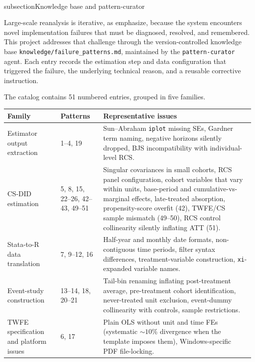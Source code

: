 \\subsection{Knowledge base and pattern-curator}
\label{sec:appc_knowledge}

Large-scale reanalysis is iterative, as \textcite{xu2026scaling} emphasize, because the system encounters novel implementation failures that must be diagnosed, resolved, and remembered. This project addresses that challenge through the version-controlled knowledge base \texttt{knowledge/failure\_patterns.md}, maintained by the \texttt{pattern-curator} agent. Each entry records the estimation step and data configuration that triggered the failure, the underlying technical reason, and a reusable corrective instruction.

The catalog contains 51 numbered entries, grouped in five families.

\begin{table}[H]
\centering
\footnotesize
\begin{tabularx}{\textwidth}{@{}l l X@{}}
\toprule
\textbf{Family} & \textbf{Patterns} & \textbf{Representative issues} \\
\midrule
Estimator output extraction            & 1--4, 19           & Sun--Abraham \texttt{iplot} missing SEs, Gardner term naming, negative horizons silently dropped, BJS incompatibility with individual-level RCS. \\
CS-DID estimation                      & 5, 8, 15, 22--26, 42--43, 49--51 & Singular covariances in small cohorts, RCS panel configuration, cohort variables that vary within units, base-period and cumulative-vs-marginal effects, late-treated absorption, propensity-score overfit (42), TWFE/CS sample mismatch (49--50), RCS control collinearity silently inflating ATT (51). \\
Stata-to-R data translation            & 7, 9--12, 16       & Half-year and monthly date formats, non-contiguous time periods, filter syntax differences, treatment-variable construction, \texttt{xi}-expanded variable names. \\
Event-study construction               & 13--14, 18, 20--21 & Tail-bin renaming inflating post-treatment average, pre-treatment cohort identification, never-treated unit exclusion, event-dummy collinearity with controls, sample restrictions. \\
TWFE specification and platform issues & 6, 17              & Plain OLS without unit and time FEs (systematic ${\sim}10\%$ divergence when the template imposes them), Windows-specific PDF file-locking. \\
\bottomrule
\end{tabularx}
\end{table}


